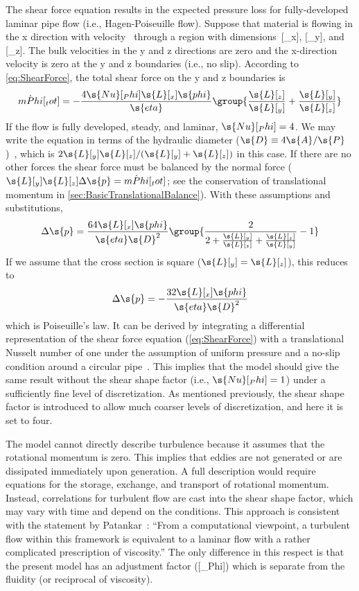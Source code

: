 The shear force equation results in the expected pressure loss for fully-developed laminar pipe flow (i.e., Hagen-Poiseuille flow)\label{mark:Poiseuille}.  Suppose that material is flowing in the x direction with velocity~ through a region with dimensions~[_x], [_y], and [_z].  The bulk velocities in the y and z  directions are zero and the x-direction velocity is zero at the y and z boundaries (i.e., no slip).  According to \autoref{eq:ShearForce}, the total shear force on the y and z boundaries is
\begin{equation}
  \dot{mPhi}[_tot] = -\frac{4\s{Nu}[_Phi]\s{L}[_x]\s{phi}}{\s{eta}}\group{\frac{\s{L}[_z]}{\s{L}[_y]} + \frac{\s{L}[_y]}{\s{L}[_z]}}
\end{equation}
If the flow is fully developed, steady, and laminar, $\s{Nu}[_Phi] = 4$.  We may write the equation in terms of the hydraulic diameter ($\s{D} \equiv 4\s{A}/\s{P}$)~\cite{Incropera2002}, which is $2\s{L}[_y]\s{L}[_z]/(\s{L}[_y] + \s{L}[_z])$ in this case.  If there are no other forces the shear force must be balanced by the normal force ($\s{L}[_y]\s{L}[_z]\Delta\s{p} = \dot{mPhi}[_tot]$; see the conservation of translational momentum in \autoref{sec:BasicTranslationalBalance}).  With these assumptions and substitutions,
\begin{equation}
  \Delta\s{p} = \frac{64\s{L}[_x]\s{phi}}{\s{eta}\s{D}^2}\group{\frac{2}{2 + \frac{\s{L}[_y]}{\s{L}[_z]} + \frac{\s{L}[_z]}{\s{L}[_y]}} - 1}
\end{equation}
If we assume that the cross section is square ($\s{L}[_y] = \s{L}[_z]$), this reduces to
\begin{equation}
  \Delta\s{p} = -\frac{32\s{L}[_x]\s{phi}}{\s{eta}\s{D}^2}
\end{equation}
which is Poiseuille's law.  It can be derived by integrating a differential representation of the shear force equation (\ref{eq:ShearForce}) with a translational Nusselt number of one under the assumption of uniform pressure and a no-slip condition around a circular pipe~\cite{Cengel2006}.  This implies that the model should give the same result without the shear shape factor (i.e., $\s{Nu}[_Phi] = 1$) under a sufficiently fine level of discretization.  As mentioned previously, the shear shape factor is introduced to allow much coarser levels of discretization, and here it is set to four.

The model cannot directly describe turbulence\label{mark:Turbulence} because it assumes that the rotational momentum is zero.  This implies that eddies are not generated or are dissipated immediately upon generation.  A full description would require equations for the storage, exchange, and transport of rotational momentum.  Instead, correlations for turbulent flow are cast into the shear shape factor, which may vary with time and depend on the conditions.  This approach is consistent with the statement by Patankar~\cite{Patankar1980}: %
``From a computational viewpoint, a turbulent flow within this framework is equivalent to a laminar flow with a rather complicated prescription of viscosity.''  The only difference in this respect is that the present model has an adjustment factor ([_Phi]) which is separate from the fluidity (or reciprocal of viscosity).

